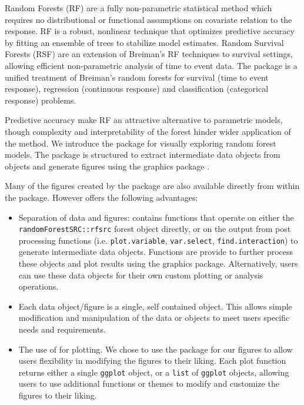 \documentclass[article]{jss}
\begin{document}
Random Forests \citep{Breiman:2001} (RF) are a fully non-parametric
statistical method which requires no distributional or functional
assumptions on covariate relation to the response. RF is a robust,
nonlinear technique that optimizes predictive accuracy by fitting an
ensemble of trees to stabilize model estimates. Random Survival Forests
(RSF) \citep[\citet{Ishwaran:2008}]{Ishwaran:2007a} are an extension of
Breiman's RF techniques to survival settings, allowing efficient
non-parametric analysis of time to event data. The 
package \citep{Ishwaran:RFSRC:2014} is a unified treatment of Breiman's
random forests for survival (time to event response), regression
(continuous response) and classification (categorical response)
problems.

Predictive accuracy make RF an attractive alternative to parametric
models, though complexity and interpretability of the forest hinder
wider application of the method. We introduce the 
package for visually exploring random forest models. The
 package is structured to extract intermediate data
objects from  objects and generate figures using
the  graphics package \citep{Wickham:2009}.

Many of the figures created by the  package are
also available directly from within the  package.
However  offers the following advantages:

\begin{itemize}
\item
  Separation of data and figures:  contains
  functions that operate on either the \texttt{randomForestSRC::rfsrc}
  forest object directly, or on the output from 
  post processing functions (i.e. \texttt{plot.variable},
  \texttt{var.select}, \texttt{find.interaction}) to generate
  intermediate  data objects. Functions are provide
  to further process these objects and plot results using the
   graphics package. Alternatively, users can use these
  data objects for their own custom plotting or analysis operations.
\item
  Each data object/figure is a single, self contained object. This
  allows simple modification and manipulation of the data or
   objects to meet users specific needs and requirements.
\item
  The use of  for plotting. We chose to use the
   package for our figures to allow users flexibility in
  modifying the figures to their liking. Each plot function returns
  either a single \texttt{ggplot} object, or a \texttt{list} of
  \texttt{ggplot} objects, allowing users to use additional
   functions or themes to modify and customize the figures
  to their liking.
\end{itemize}
\end{document}
